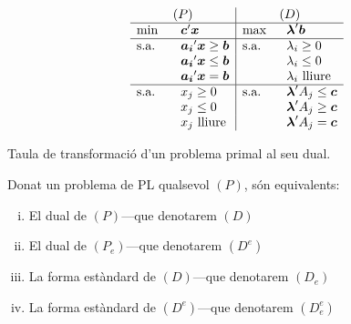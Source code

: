 \begin{table}[ht]
	\centering
	\setlength{\tabcolsep}{6ex}
	\renewcommand{\arraystretch}{1.5}
	\[
	\begin{array}{ll|ll}
	\multicolumn{2}{c|}{(P)}				
	&\multicolumn{2}{c}{(D)} \\
	\hline
	\min 	&\vb{c}'\vb{x}
	&\max 	&\vb{\lambda}'\vb{b}\\
	\hline
	\text{s.a.}\quad	&\vb{a_i}'\vb{x} \ge \vb{b}
	&\text{s.a.}\quad	&{\lambda_i} \ge 0\\
	&\vb{a_i}'\vb{x} \le \vb{b}
	&					&{\lambda_i} \le 0\\
	&\vb{a_i}'\vb{x} = \vb{b}
	&					&\lambda_i \text{ lliure}\\
	\hline
	\text{s.a.}\quad	&x_j \ge 0
	&\text{s.a.}\quad	&\vb{\lambda}'A_j \le \vb{c}\\
	&x_j \le 0
	&					&\vb{\lambda}'A_j \ge \vb{c}\\
	&x_j \text{ lliure}
	&					&\vb{\lambda}'A_j = \vb{c}\\
	\end{array}
	\]
	\caption{Taula de transformació d'un problema primal al seu
		dual.}\label{tab:dual}
\end{table}


\begin{prop}
	Donat un problema de PL qualsevol $(P)$, són equivalents:
	\begin{enumerate}[(i)]
		\item El dual de $(P)$---que denotarem $(D)$
		\item El dual de $(P_e)$---que denotarem $(D^e)$
		\item La forma estàndard de $(D)$---que denotarem $(D_e)$
		\item La forma estàndard de $(D^e)$---que denotarem $(D^e_e)$
	\end{enumerate}
\end{prop}

